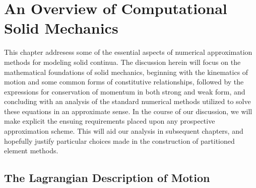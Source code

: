 \chapter{An Overview of Computational Solid Mechanics} \label{ch:solid_mechanics}
%
This chapter addresess some of the essential aspects of numerical approximation methods for modeling solid continua. The discussion herein will focus on the mathematical foundations of solid mechanics, beginning with the kinematics of motion and some common forms of constitutive relationships, followed by the expressions for conservation of momentum in both strong and weak form, and concluding with an analysis of the standard numerical methods utilized to solve these equations in an approximate sense. In the course of our discussion, we will make explicit the ensuing requirements placed upon any prospective approximation scheme. This will aid our analysis in subsequent chapters, and hopefully justify particular choices made in the construction of partitioned element methods.

\newpage

\section{The Lagrangian Description of Motion}

